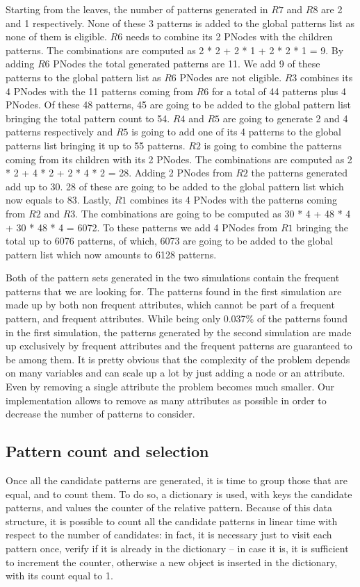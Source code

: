 \documentclass{acm_proc_article-sp-sigmod09}
\begin{document}
Starting from the leaves, the number of patterns generated in $R7$ and $R8$ are 2 and 1 respectively. None of these 3 patterns is added to the global patterns list as none of them is eligible. $R6$ needs to combine its 2 PNodes with the children patterns. The combinations are computed as 2 * 2 + 2 * 1 + 2 * 2 * 1 = 9. By adding $R6$ PNodes the total generated patterns are 11. We add 9 of these patterns to the global pattern list as $R6$ PNodes are not eligible. $R3$ combines its 4 PNodes with the 11 patterns coming from $R6$ for a total of 44 patterns plus 4 PNodes. Of these 48 patterns, 45 are going to be added to the global pattern list bringing the total pattern count to 54. $R4$ and $R5$ are going to generate 2 and 4 patterns respectively and $R5$ is going to add one of its 4 patterns to the global patterns list bringing it up to 55 patterns. $R2$ is going to combine the patterns coming from its children with its 2 PNodes. The combinations are computed as 2 * 2 + 4 * 2 + 2 * 4 * 2 = 28. Adding 2 PNodes from $R2$ the patterns generated add up to 30. 28 of these are going to be added to the global pattern list which now equals to 83. Lastly, $R1$ combines its 4 PNodes with the patterns coming from $R2$ and $R3$. The combinations are going to be computed as 30 * 4 + 48 * 4 + 30 * 48 * 4 = 6072. To these patterns we add 4 PNodes from $R1$ bringing the total up to 6076 patterns, of which, 6073 are going to be added to the global pattern list which now amounts to 6128 patterns.

Both of the pattern sets generated in the two simulations contain the frequent patterns that we are looking for. The patterns found in the first simulation are made up by both non frequent attributes, which cannot be part of a frequent pattern, and frequent attributes. While being only 0.037\% of the patterns found in the first simulation, the patterns generated by the second simulation are made up exclusively by frequent attributes and the frequent patterns are guaranteed to be among them. It is pretty obvious that the complexity of the problem depends on many variables and can scale up a lot by just adding a node or an attribute. Even by removing a single attribute the problem becomes much smaller. Our implementation allows to remove as many attributes as possible in order to decrease the number of patterns to consider.

\subsection{Pattern count and selection}
Once all the candidate patterns are generated, it is time to group those that are equal, and to count them. To do so, a dictionary is used, with keys the candidate patterns, and values the counter of the relative pattern. Because of this data structure, it is possible to count all the candidate patterns in linear time with respect to the number of candidates: in fact, it is necessary just to visit each pattern once, verify if it is already in the dictionary -- in case it is, it is sufficient to increment the counter, otherwise a new object is inserted in the dictionary, with its count equal to 1.
\end{document}
